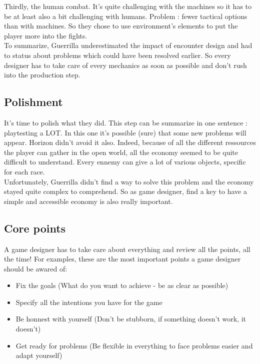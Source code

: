 \documentclass[a4paper]{article}
\begin{document}
\noindent Thirdly, the human combat. It's quite challenging with the machines so it has to be
at least also a bit challenging with humans. Problem : fewer tactical options than with machines.
So they chose to use environment's elements to put the player more into the fights.\\

\noindent To summarize, Guerrilla underestimated the impact of encounter design and had to status about
problems which could have been resolved earlier. So every designer has to take care of every 
mechanics as soon as possible and don't rush into the production step.


\subsection{Polishment}

It's time to polish what they did. This step can be summarize in one sentence : playtesting a LOT. In 
this one it's possible (sure) that some new problems will appear. Horizon didn't
avoid it also. Indeed, because of all the different ressources the player can gather in the open world,
all the economy seemed to be quite difficult to understand. Every ennemy can give
a lot of various objects, specific for each race.\\

\noindent Unfortunately, Guerrilla didn't find a way to solve this problem and the
economy stayed quite complex to comprehend. So as game designer, find a key to have a simple
and accessible economy is also really important.


\subsection{Core points}

A game designer has to take care about everything and review all the points, all the time!
For examples, these are the most important points a game designer should be awared of:
\begin{itemize}
  \item Fix the goals (What do you want to achieve - be as clear as possible)
  \item Specify all the intentions you have for the game
  \item Be honnest with yourself (Don't be stubborn, if something doesn't work, it doesn't)
  \item Get ready for problems (Be flexible in everything to face problems easier and adapt yourself)
\end{itemize}
\end{document}
